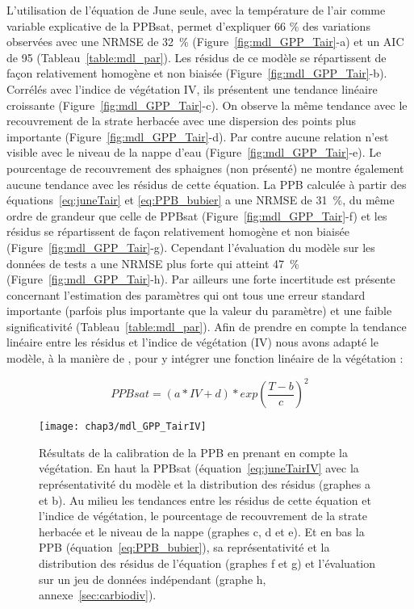 L'utilisation de l'équation de June seule, avec la température de l'air comme variable explicative de la PPBsat, permet d'expliquer 66 \% des variations observées avec une NRMSE de \SI{32}{\percent} (Figure~\ref{fig:mdl_GPP_Tair}-a) et un AIC de 95 (Tableau~\ref{table:mdl_par}).
Les résidus de ce modèle se répartissent de façon relativement homogène et non biaisée (Figure~\ref{fig:mdl_GPP_Tair}-b).
Corrélés avec l'indice de végétation IV, ils présentent une tendance linéaire croissante (Figure~\ref{fig:mdl_GPP_Tair}-c).
On observe la même tendance avec le recouvrement de la strate herbacée avec une dispersion des points plus importante (Figure~\ref{fig:mdl_GPP_Tair}-d).
Par contre aucune relation n'est visible avec le niveau de la nappe d'eau (Figure~\ref{fig:mdl_GPP_Tair}-e).
Le pourcentage de recouvrement des sphaignes (non présenté) ne montre également aucune tendance avec les résidus de cette équation.
La PPB calculée à partir des équations~\ref{eq:juneTair} et \ref{eq:PPB_bubier} a une NRMSE de \SI{31}{\percent}, du même ordre de grandeur que celle de PPBsat (Figure~\ref{fig:mdl_GPP_Tair}-f) et les résidus se répartissent de façon relativement homogène et non biaisée (Figure~\ref{fig:mdl_GPP_Tair}-g).
Cependant l'évaluation du modèle sur les données de tests a une NRMSE plus forte qui atteint \SI{47}{\percent}(Figure~\ref{fig:mdl_GPP_Tair}-h).
Par ailleurs une forte incertitude est présente concernant l'estimation des paramètres qui ont tous une erreur standard importante (parfois plus importante que la valeur du paramètre) et une faible significativité (Tableau~\ref{table:mdl_par}).
Afin de prendre en compte la tendance linéaire entre les résidus et l'indice de végétation (IV) nous avons adapté le modèle, à la manière de \citet{bortoluzzi2006a}, pour y intégrer une fonction linéaire de la végétation :

\begin{equation}\label{eq:juneTairIV}
PPBsat = (a * IV + d) * exp\left(\frac{T - b}{c}\right)^2
\end{equation}

\begin{figure} %
\centering
\texttt{[image: chap3/mdl\_GPP\_TairIV]}
\caption{Résultats de la calibration de la PPB en prenant en compte la végétation. En haut la PPBsat (équation~\ref{eq:juneTairIV} avec la représentativité du modèle et la distribution des résidus (graphes a et b). Au milieu les tendances entre les résidus de cette équation et l'indice de végétation, le pourcentage de recouvrement de la strate herbacée et le niveau de la nappe (graphes c, d et e). Et en bas la PPB (équation~\ref{eq:PPB_bubier}), sa représentativité et la distribution des résidus de l'équation (graphes f et g) et l'évaluation sur un jeu de données indépendant (graphe h, annexe~\ref{sec:carbiodiv}).}
\label{fig:mdl_GPP_TairIV}
\end{figure}


